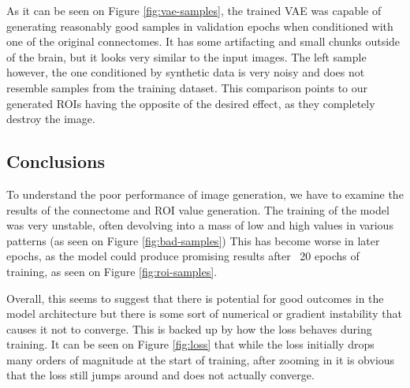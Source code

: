 	
	As it can be seen on Figure \ref{fig:vae-samples}, the trained VAE was capable of generating reasonably good samples in validation epochs when conditioned with one of the original connectomes. It has some artifacting and small chunks outside of the brain, but it looks very similar to the input images. The left sample however, the one conditioned by synthetic data is very noisy and does not resemble samples from the training dataset. This comparison points to our generated ROIs having the opposite of the desired effect, as they completely destroy the image.
	
	\subsection{Conclusions}
	
	To understand the poor performance of image generation, we have to examine the results of the connectome and ROI value generation. The training of the model was very unstable, often devolving into a mass of low and high values in various patterns (as seen on Figure \ref{fig:bad-samples})
	This has become worse in later epochs, as the model could produce promising results after ~20 epochs of training, as seen on Figure \ref{fig:roi-samples}. 
	
	Overall, this seems to suggest that there is potential for good outcomes in the model architecture but there is some sort of numerical or gradient instability that causes it not to converge. This is backed up by how the loss behaves during training. It can be seen on Figure \ref{fig:loss} that while the loss initially drops many orders of magnitude at the start of training, after zooming in it is obvious that the loss still jumps around and does not actually converge.
	
